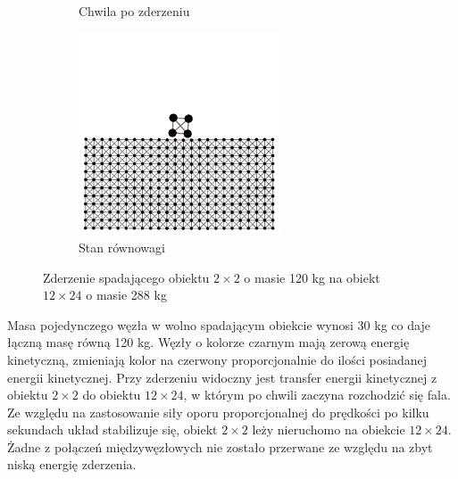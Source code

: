 \documentclass[12pt, letterpaper]{report}
\begin{document}
\begin{figure}[h]
\begin{subfigure}{0.5\textwidth}
            \caption{Chwila po zderzeniu}
        \end{subfigure}
        \begin{subfigure}{0.5\textwidth}
            \centering
            \includegraphics[width=6cm, height=6cm]{collision_2x2_24x12_mass30_4}
            \caption{Stan równowagi}
        \end{subfigure}
        
        \caption{Zderzenie spadającego obiektu $2 \times 2$ o masie 120 kg na obiekt $12 \times 24$ o masie 288 kg}
    \end{figure}
    Masa pojedynczego węzła w wolno spadającym obiekcie wynosi 30 kg co daje łączną masę równą 120 kg.
    Węzły o kolorze czarnym mają zerową energię kinetyczną, 
    zmieniają kolor na czerwony proporcjonalnie do ilości posiadanej energii kinetycznej. 
    Przy zderzeniu widoczny jest transfer energii kinetycznej z obiektu $2 \times 2$ do obiektu $12 \times 24$, 
    w którym po chwili zaczyna rozchodzić się fala. Ze względu na zastosowanie siły oporu proporcjonalnej do prędkości
    po kilku sekundach układ stabilizuje się, obiekt $2 \times 2$ leży nieruchomo na obiekcie $12 \times 24$. 
    Żadne z połączeń międzywęzłowych nie zostało przerwane ze względu na zbyt niską energię zderzenia.

    \clearpage
\end{document}

